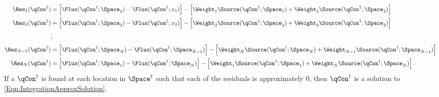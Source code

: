 \begin{equation}
\begin{split}
    \Rez_1(\qCon^\dagger)     &= 
            \left[\Flux(\qCon^\dagger;\Space_{2}) - \Flux(\qCon^\dagger;x_1)                               \right] -
            \left[\Weight_1 \Source(\qCon^\dagger;\Space_{1}) + \Weight_{2  } \Source(\qCon^\dagger;\Space_{2  }) \right] \\[0.1em]
    \Rez_2(\qCon^\dagger)     &= \left[\Flux(\qCon^\dagger;\Space_{3}) - \Flux(\qCon^\dagger;x_2)                               \right] -
                              \left[\Weight_2 \Source(\qCon^\dagger;\Space_{2}) + \Weight_{3  } \Source(\qCon^\dagger;\Space_{3  }) \right] \\[0.0em]
                           &  \vdots                                                                                      \\
    \Rez_{N-1}(\qCon^\dagger) &= \left[\Flux(\qCon^\dagger;\Space_{N}) - \Flux(\qCon^\dagger;\Space_{N-1})                           \right] -
                              \left[\Weight_N \Source(\qCon^\dagger;\Space_{N}) + \Weight_{N-1} \Source(\qCon^\dagger;\Space_{N-1}) \right] \\[0.1em]
    \Rez_N(\qCon^\dagger)     &= \left[\Flux(\qCon^\dagger;\Space_{1}) - \Flux(\qCon^\dagger;\Space_N)                               \right] -
                              \left[\Weight_1 \Source(\qCon^\dagger;\Space_{1}) + \Weight_{N  } \Source(\qCon^\dagger;\Space_{N  }) \right].
\end{split}\label{Eqn:EachResidualEquation}
\end{equation}
If a $\qCon^\dagger$ is found at each location in $\Space^\dagger$ such that each of the residuals is approximately $0$, then $\qCon^\dagger$ is a solution to \cref{Eqn:IntegrationApproxSolution}.

